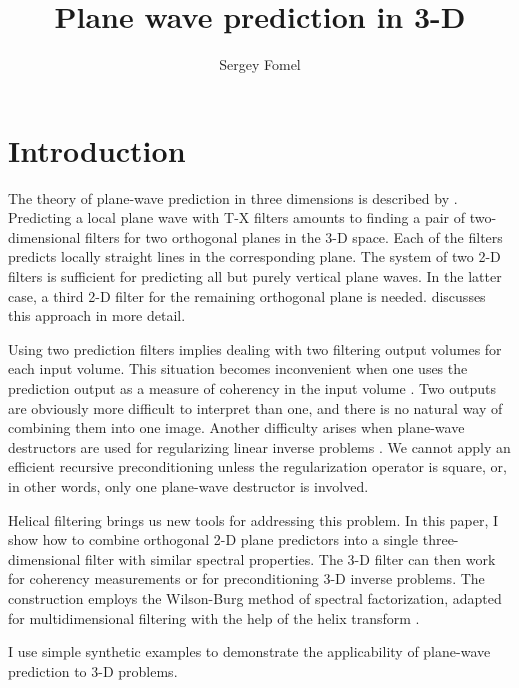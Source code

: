 \title{Plane wave prediction in 3-D}


\author{Sergey Fomel}

\shortpaper
\maketitle

\section{Introduction}

The theory of plane-wave prediction in three dimensions is described
by \cite{Claerbout.sep.77.19,gee}. Predicting a local plane wave with
T-X filters amounts to finding a pair of two-dimensional filters
for two orthogonal planes in the 3-D space.  Each of the filters
predicts locally straight lines in the corresponding plane. The system
of two 2-D filters is sufficient for predicting all but purely
vertical plane waves. In the latter case, a third 2-D filter for the
remaining orthogonal plane is needed.  \cite{Schwab.sepphd.99}
discusses this approach in more detail.
\par
Using two prediction filters implies dealing with two filtering output
volumes for each input volume. This situation becomes inconvenient
when one
uses the prediction output as a measure of coherency in the input
volume \cite[]{Claerbout.sep.77.19,Schwab.sep.92.29}. Two outputs are
obviously more difficult to interpret than one, and there is no
natural way of combining them into one image. Another difficulty
arises when plane-wave destructors are used for regularizing linear
inverse problems \cite[]{Clapp.sep.95.bob1}. We cannot
apply an efficient recursive preconditioning
\cite[]{Claerbout.sep.97.jon2} unless the regularization operator is
square, or, in other words, only one plane-wave destructor is involved.
\par
Helical filtering \cite[]{GEO63-05-15321541} brings us new tools for
addressing this problem. In this paper, I show how to combine
orthogonal 2-D plane predictors into a single three-dimensional filter
with similar spectral properties. The 3-D filter can then work for
coherency measurements or for preconditioning 3-D inverse problems.
The construction employs the Wilson-Burg method of spectral
factorization, adapted for multidimensional filtering with the help of
the helix transform \cite[]{Sava.sep.97.paul1}.
\par
I use simple synthetic examples to demonstrate the applicability of 
plane-wave prediction to 3-D problems.

